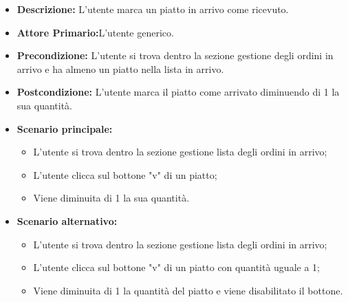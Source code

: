 \begin{itemize}
    \item \textbf{Descrizione:} L'utente marca un piatto in arrivo come ricevuto.
    \item \textbf{Attore Primario:}L'utente generico.
    \item \textbf{Precondizione:} L'utente si trova dentro la sezione gestione degli ordini in arrivo e ha almeno un piatto nella lista in arrivo.
    \item \textbf{Postcondizione:} L'utente marca il piatto come arrivato diminuendo di 1 la sua quantità.
    \item \textbf{Scenario principale:}
    \begin{itemize}
        \item L'utente si trova dentro la sezione gestione lista degli ordini in arrivo;
        \item L'utente clicca sul bottone "v" di un piatto;
        \item Viene diminuita di 1 la sua quantità.
    \end{itemize}
    \item \textbf{Scenario alternativo:}
    \begin{itemize}
        \item L'utente si trova dentro la sezione gestione lista degli ordini in arrivo;
        \item L'utente clicca sul bottone "v" di un piatto con quantità uguale a 1;
        \item Viene diminuita di 1 la quantità del piatto e viene disabilitato il bottone.
    \end{itemize}
\end{itemize}

